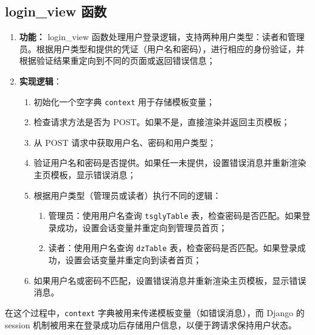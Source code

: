 \documentclass{ctexart}
\begin{document}
    \subsection{login\_view 函数}
    \begin{enumerate}
        \item \textbf{功能：} login\_view 函数处理用户登录逻辑，支持两种用户类型：读者和管理员。根据用户类型和提供的凭证（用户名和密码），进行相应的身份验证，并根据验证结果重定向到不同的页面或返回错误信息；
        \item \textbf{实现逻辑}：
        \begin{enumerate}
            \item 初始化一个空字典 \texttt{context} 用于存储模板变量；
            \item 检查请求方法是否为 POST。如果不是，直接渲染并返回主页模板；
            \item 从 POST 请求中获取用户名、密码和用户类型；
            \item 验证用户名和密码是否提供。如果任一未提供，设置错误消息并重新渲染主页模板，显示错误消息；
            \item 根据用户类型（管理员或读者）执行不同的逻辑：
            \begin{enumerate}
                \item 管理员：使用用户名查询 \texttt{tsglyTable} 表，检查密码是否匹配。如果登录成功，设置会话变量并重定向到管理员首页；
                \item 读者：使用用户名查询 \texttt{dzTable} 表，检查密码是否匹配。如果登录成功，设置会话变量并重定向到读者首页；
            \end{enumerate}
            \item 如果用户名或密码不匹配，设置错误消息并重新渲染主页模板，显示错误消息。
        \end{enumerate}
    \end{enumerate}
    在这个过程中，\texttt{context} 字典被用来传递模板变量（如错误消息），而 Django 的 session 机制被用来在登录成功后存储用户信息，以便于跨请求保持用户状态。
\end{document}
